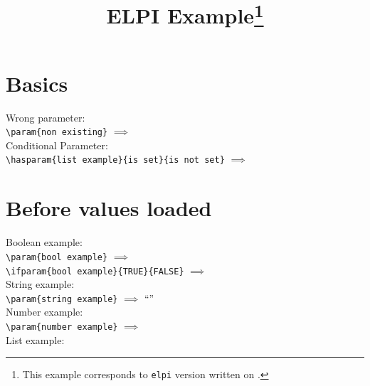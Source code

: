 \documentclass{article}
\begin{document}
    \title{ELPI Example\thanks{This example corresponds to \texttt{elpi} version \gitversion{} written on \gitdate.}}
    \author{\dogitauthors[\\]}
    \maketitle

    \section*{Basics}
    Wrong parameter:\\

    \lstinline[style=TeX,morekeywords={param}]|\param{non existing}|
    $\implies$
    \\

    Conditional Parameter:\\

    \lstinline[style=TeX,morekeywords={hasparam}]|\hasparam{list example}{is set}{is not set}|
    $\implies$

    \section*{Before values loaded}

    Boolean example:\\

    \lstinline[style=TeX,morekeywords={param}]|\param{bool example}|
    $\implies$
    \\

    \lstinline[style=TeX,morekeywords={ifparam}]|\ifparam{bool example}{TRUE}{FALSE}|
    $\implies$
    \\

    String example:\\

    \lstinline[style=TeX,morekeywords={param}]|\param{string example}|
    $\implies$
    ``''\\

    Number example:\\

    \lstinline[style=TeX,morekeywords={param}]|\param{number example}|
    $\implies$
    \\

    List example:\\
\end{document}
